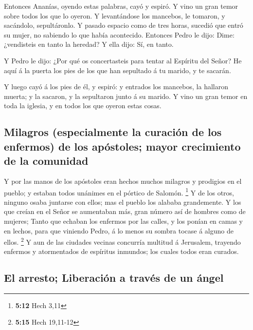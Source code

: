  Entonces Ananías, oyendo estas palabras, cayó y espiró. Y
vino un gran temor sobre todos los que lo oyeron.  Y
levantándose los mancebos, le tomaron, y sacándolo, sepultáronlo.
 Y pasado espacio como de tres horas, sucedió que entró su
mujer, no sabiendo lo que había acontecido.  Entonces Pedro
le dijo: Dime: ¿vendisteis en tanto la heredad? Y ella dijo: Sí, en
tanto.

 Y Pedro le dijo: ¿Por qué os concertasteis para tentar al
Espíritu del Señor? He aquí á la puerta los pies de los que han
sepultado á tu marido, y te sacarán.

 Y luego cayó á los pies de él, y espiró: y entrados los
mancebos, la hallaron muerta; y la sacaron, y la sepultaron junto á su
marido.  Y vino un gran temor en toda la iglesia, y en
todos los que oyeron estas cosas.

\hypertarget{milagros-especialmente-la-curaciuxf3n-de-los-enfermos-de-los-apuxf3stoles-mayor-crecimiento-de-la-comunidad}{%
\subsection{Milagros (especialmente la curación de los enfermos) de los
apóstoles; mayor crecimiento de la
comunidad}\label{milagros-especialmente-la-curaciuxf3n-de-los-enfermos-de-los-apuxf3stoles-mayor-crecimiento-de-la-comunidad}}

 Y por las manos de los apóstoles eran hechos muchos
milagros y prodigios en el pueblo; y estaban todos unánimes en el
pórtico de Salomón. \footnote{\textbf{5:12} Hech 3,11}  Y
de los otros, ninguno osaba juntarse con ellos; mas el pueblo los
alababa grandemente.  Y los que creían en el Señor se
aumentaban más, gran número así de hombres como de mujeres;
 Tanto que echaban los enfermos por las calles, y los
ponían en camas y en lechos, para que viniendo Pedro, á lo menos su
sombra tocase á alguno de ellos. \footnote{\textbf{5:15} Hech 19,11-12}
 Y aun de las ciudades vecinas concurría multitud á
Jerusalem, trayendo enfermos y atormentados de espíritus inmundos; los
cuales todos eran curados.

\hypertarget{el-arresto-liberaciuxf3n-a-travuxe9s-de-un-uxe1ngel}{%
\subsection{El arresto; Liberación a través de un
ángel}\label{el-arresto-liberaciuxf3n-a-travuxe9s-de-un-uxe1ngel}}

